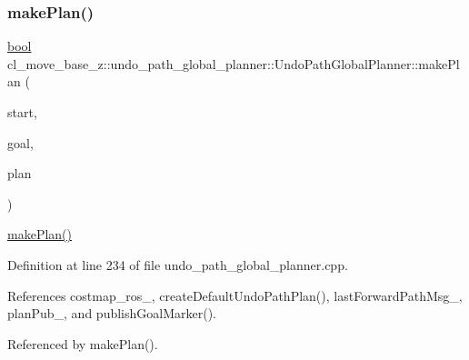 \subsubsection{\texorpdfstring{make\+Plan()}{makePlan()}\hspace{0.1cm}{\footnotesize\ttfamily [1/2]}}
{\footnotesize\ttfamily \hyperlink{classbool}{bool} cl\+\_\+move\+\_\+base\+\_\+z\+::undo\+\_\+path\+\_\+global\+\_\+planner\+::\+Undo\+Path\+Global\+Planner\+::make\+Plan (\begin{DoxyParamCaption}\item[{const geometry\+\_\+msgs\+::\+Pose\+Stamped \&}]{start,  }\item[{const geometry\+\_\+msgs\+::\+Pose\+Stamped \&}]{goal,  }\item[{std\+::vector$<$ geometry\+\_\+msgs\+::\+Pose\+Stamped $>$ \&}]{plan }\end{DoxyParamCaption})}

\hyperlink{classcl__move__base__z_1_1undo__path__global__planner_1_1UndoPathGlobalPlanner_a46034d27c0811abae440009457a7f8b0}{make\+Plan()} 

Definition at line 234 of file undo\+\_\+path\+\_\+global\+\_\+planner.\+cpp.



References costmap\+\_\+ros\+\_\+, create\+Default\+Undo\+Path\+Plan(), last\+Forward\+Path\+Msg\+\_\+, plan\+Pub\+\_\+, and publish\+Goal\+Marker().



Referenced by make\+Plan().


